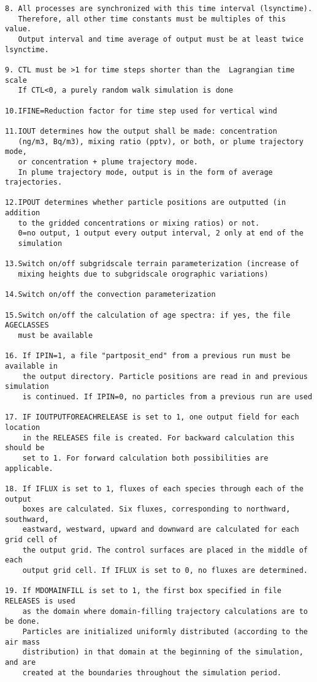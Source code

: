 \documentclass{egu}            %
\begin{document}
\begin{scriptsize}
\begin{verbatim}
8. All processes are synchronized with this time interval (lsynctime).
   Therefore, all other time constants must be multiples of this value.
   Output interval and time average of output must be at least twice lsynctime.

9. CTL must be >1 for time steps shorter than the  Lagrangian time scale
   If CTL<0, a purely random walk simulation is done

10.IFINE=Reduction factor for time step used for vertical wind

11.IOUT determines how the output shall be made: concentration
   (ng/m3, Bq/m3), mixing ratio (pptv), or both, or plume trajectory mode,
   or concentration + plume trajectory mode.
   In plume trajectory mode, output is in the form of average trajectories.

12.IPOUT determines whether particle positions are outputted (in addition
   to the gridded concentrations or mixing ratios) or not.
   0=no output, 1 output every output interval, 2 only at end of the
   simulation

13.Switch on/off subgridscale terrain parameterization (increase of
   mixing heights due to subgridscale orographic variations)

14.Switch on/off the convection parameterization

15.Switch on/off the calculation of age spectra: if yes, the file AGECLASSES
   must be available

16. If IPIN=1, a file "partposit_end" from a previous run must be available in
    the output directory. Particle positions are read in and previous simulation
    is continued. If IPIN=0, no particles from a previous run are used

17. IF IOUTPUTFOREACHRELEASE is set to 1, one output field for each location
    in the RELEASES file is created. For backward calculation this should be
    set to 1. For forward calculation both possibilities are applicable.

18. If IFLUX is set to 1, fluxes of each species through each of the output
    boxes are calculated. Six fluxes, corresponding to northward, southward,
    eastward, westward, upward and downward are calculated for each grid cell of
    the output grid. The control surfaces are placed in the middle of each
    output grid cell. If IFLUX is set to 0, no fluxes are determined.

19. If MDOMAINFILL is set to 1, the first box specified in file RELEASES is used
    as the domain where domain-filling trajectory calculations are to be done.
    Particles are initialized uniformly distributed (according to the air mass
    distribution) in that domain at the beginning of the simulation, and are
    created at the boundaries throughout the simulation period.


\end{verbatim}
\end{scriptsize}
\end{document}
